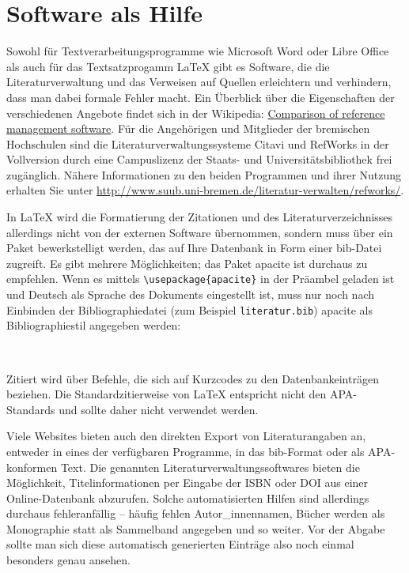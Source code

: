 \documentclass[ngerman,bibliography=totoc,oneside,12pt,a4paper]{scrbook}
\begin{document}
\hypertarget{sec:software}{\section{Software als
Hilfe}\label{sec:software}}

Sowohl für Textverarbeitungsprogramme wie Microsoft Word oder Libre
Office als auch für das Textsatzprogamm LaTeX gibt es Software, die die
Literaturverwaltung und das Verweisen auf Quellen erleichtern und
verhindern, dass man dabei formale Fehler macht. Ein Überblick über die
Eigenschaften der verschiedenen Angebote findet sich in der Wikipedia:
\href{http://en.wikipedia.org/wiki/Comparison_of_reference_management_software}{Comparison
of reference management software}. Für die Angehörigen und Mitglieder
der bremischen Hochschulen sind die Literaturverwaltungssysteme Citavi
und RefWorks in der Vollversion durch eine Campuslizenz der Staats- und
Universitätsbibliothek frei zugänglich. Nähere Informationen zu den
beiden Programmen und ihrer Nutzung erhalten Sie unter
\url{http://www.suub.uni-bremen.de/literatur-verwalten/refworks/}.

In LaTeX wird die Formatierung der Zitationen und des
Literaturverzeichnisses allerdings nicht von der externen Software
übernommen, sondern muss über ein Paket bewerkstelligt werden, das auf
Ihre Datenbank in Form einer bib-Datei zugreift. Es gibt mehrere
Möglichkeiten; das Paket apacite ist durchaus zu empfehlen. Wenn es
mittels \texttt{\textbackslash{}usepackage\{apacite\}} in der Präambel
geladen ist und Deutsch als Sprache des Dokuments eingestellt ist, muss
nur noch nach Einbinden der Bibliographiedatei (zum Beispiel
\texttt{literatur.bib}) apacite als Bibliographiestil angegeben werden:

\begin{verbatim}


\end{verbatim}

Zitiert wird über Befehle, die sich auf Kurzcodes zu den
Datenbankeinträgen beziehen. Die Standardzitierweise von LaTeX
entspricht nicht den APA-Standards und sollte daher nicht verwendet
werden.

Viele Websites bieten auch den direkten Export von Literaturangaben an,
entweder in eines der verfügbaren Programme, in das bib-Format oder als
APA-konformen Text. Die genannten Literaturverwaltungssoftwares bieten
die Möglichkeit, Titelinformationen per Eingabe der ISBN oder DOI aus
einer Online-Datenbank abzurufen. Solche automatisierten Hilfen sind
allerdings durchaus fehleranfällig -- häufig fehlen Autor\_innennamen,
Bücher werden als Monographie statt als Sammelband angegeben und so
weiter. Vor der Abgabe sollte man sich diese automatisch generierten
Einträge also noch einmal besonders genau ansehen.
\end{document}
